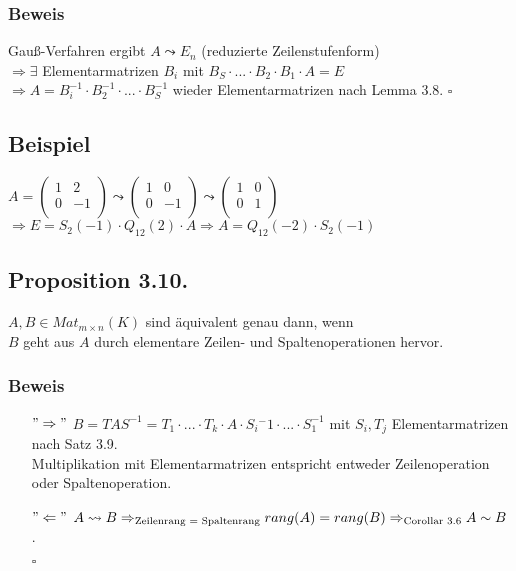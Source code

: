 \documentclass[a4paper, 12pt]{extarticle}
\newcommand{\tn}[1]{\textnormal {#1}}
\begin{document}
\subsubsection*{Beweis}
Gauß-Verfahren ergibt $A \leadsto E_n$ (reduzierte Zeilenstufenform)\\
$\Rightarrow \exists$ Elementarmatrizen $B_i$ mit $B_S\cdot ... \cdot B_2 \cdot B_1 \cdot A = E$\\
$\Rightarrow A = B_i^{-1} \cdot B_2^{-1} \cdot ... \cdot B_S^{-1}$ wieder Elementarmatrizen nach Lemma 3.8. $\square$

\subsection*{Beispiel}
$A=
\left( \begin{matrix}
1 & 2 \\
0 & -1 \\
\end{matrix} \right) \leadsto
\left( \begin{matrix}
1 & 0 \\
0 & -1 \\
\end{matrix} \right) \leadsto
\left( \begin{matrix}
1 & 0 \\
0 & 1 \\
\end{matrix} \right)
$\\
$
\Rightarrow E = S_2(-1) \cdot Q_{12}(2) \cdot A \Rightarrow A = Q_{12}(-2) \cdot S_2(-1)$

\subsection*{Proposition 3.10.}
$A,B \in Mat_{m\times n}(K)$ sind äquivalent genau dann, wenn \\
$B$ geht aus $A$ durch elementare Zeilen- und Spaltenoperationen hervor.\\

\subsubsection*{Beweis}
\begin{itemize}
\item[$"\Rightarrow"$]$ B = TAS^{-1} = T_1\cdot ... \cdot T_k \cdot A \cdot S_i{^-1} \cdot ... \cdot S_1^{-1}$ mit $S_i, T_j$ Elementarmatrizen nach Satz 3.9.\\
Multiplikation mit Elementarmatrizen entspricht entweder Zeilenoperation oder Spaltenoperation.\\
\item[$"\Leftarrow"$]
$ A \leadsto B \Rightarrow_{\tn{Zeilenrang = Spaltenrang}} rang(A) = rang(B) \Rightarrow_{\tn{Corollar 3.6}} A \sim B$.\\
\begin{flushright}
$\square$
\end{flushright}
\end{itemize}
\end{document}
